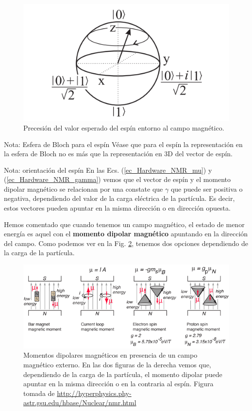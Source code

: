 	\begin{figure}[H]
	\centering 
	\includegraphics[width=0.45\linewidth]{Figuras/Fig_Harware_NMR_precesion.png}
	\caption{Precesión del valor esperado del espín entorno al campo magnético.}
	\label{Fig_Harware_NMR_precesion}
	\end{figure}

	\begin{mybox_blue}{Nota: Esfera de Bloch para el espín}
	Véase que para el espín la representación en la esfera de Bloch no es más que la representación 
	en 3D del vector de espín. 	
	\end{mybox_blue}

	\begin{mybox_blue}{Nota: orientación del espín}
	En las Ecs. (\ref{ec_Hardware_NMR_mu}) y (\ref{ec_Hardware_NMR_gamma}) vemos que el vector de espín
	y el momento dipolar magnético se relacionan por una constate que $\gamma$ que puede ser positiva o 
	negativa, dependiendo del valor de la carga eléctrica de la partícula. Es decir, estos vectores pueden 
	apuntar en la misma dirección o en dirección opuesta. 

	\vspace{0.3cm}	
	Hemos comentado que cuando tenemos un campo magnético, el
	estado de menor energía es aquel con el \textbf{momento dipolar magnético} apuntando en la dirección 
	del campo. Como podemos ver en la Fig. \ref{Fig_Hardware_NMR_espines_en_B}, tenemos dos opciones 
	dependiendo de la carga de la partícula.
		\begin{figure}[H]
		\centering 
		\includegraphics[width=1\linewidth]{Figuras/Fig_Hardware_NMR_espines_en_B.png}
		\caption{Momentos dipolares magnéticos en presencia de un campo magnético externo. En las dos figuras de la derecha vemos que, dependiendo de la carga de la partícula, el momento dipolar puede apuntar en la misma dirección o en la contraria al espín. Figura tomada de \url{http://hyperphysics.phy-astr.gsu.edu/hbase/Nuclear/nmr.html}}
		\label{Fig_Hardware_NMR_espines_en_B}
		\end{figure}
	\end{mybox_blue}


